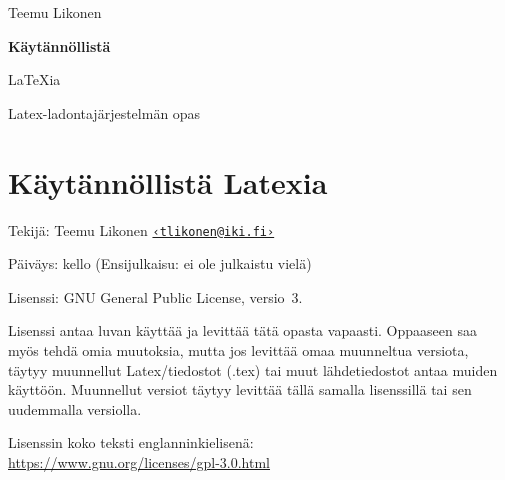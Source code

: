 \documentclass{book}
\begin{document}
\vspace*{4cm}

{

  \setlength{\parindent}{0pt}

  \fontsize{14bp}{14bp}\rmfamily Teemu Likonen

  \fontsize{48bp}{48bp}\sffamily\bfseries
  \hspace{-3bp}%
  { Käytännöllistä}

  \hspace{-7bp}%
  {
    \LaTeX{}ia}

}

\vfill

{

  \raggedleft
  Latex-ladontajärjestelmän opas \\
  \DTMtoday

}

\clearpage
\restoregeometry
{}

\null\vfill

{
  \setlength{\parindent}{0em}
  \setlength{\parskip}{1.2ex plus .1ex}

  \section*{Käytännöllistä Latexia}

  Tekijä: Teemu Likonen
  \href{mailto:tlikonen@iki.fi}{\nolinkurl{‹tlikonen@iki.fi›}}

   Päiväys: \DTMtoday{} kello
  \DTMcurrenttime{} (Ensijulkaisu: ei ole julkaistu vielä)

  Lisenssi: \textenglish{GNU General Public License}, versio~3.

  Lisenssi antaa luvan käyttää ja levittää tätä opasta vapaasti.
  Oppaaseen saa myös tehdä omia muutoksia, mutta jos levittää omaa
  muunneltua versiota, täytyy muunnellut Latex\-/tiedostot (.tex) tai
  muut lähdetiedostot antaa muiden käyttöön. Muunnellut versiot täytyy
  levittää tällä samalla lisenssillä tai sen uudemmalla versiolla.

  Lisenssin koko teksti englanninkielisenä: \\
  \url{https://www.gnu.org/licenses/gpl-3.0.html}

}

\cleardoublepage
\pagestyle{plain}
\end{document}
